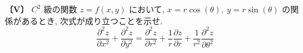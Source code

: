 \noindent\textbf{〔V〕}
$C^2$ 級の関数 $z=f(x,y)$ において, $x=r\cos(\theta),\ y=r\sin(\theta)$ の関係があるとき,
次式が成り立つことを示せ.
\[
\frac{\partial^2 z}{\partial x^2}+\frac{\partial^2 z}{\partial y^2}
=\frac{\partial^2 z}{\partial r^2}+\frac{1}{r}\frac{\partial z}{\partial r}
+\frac{1}{r^2}\frac{\partial^2 z}{\partial \theta^2}
\]
